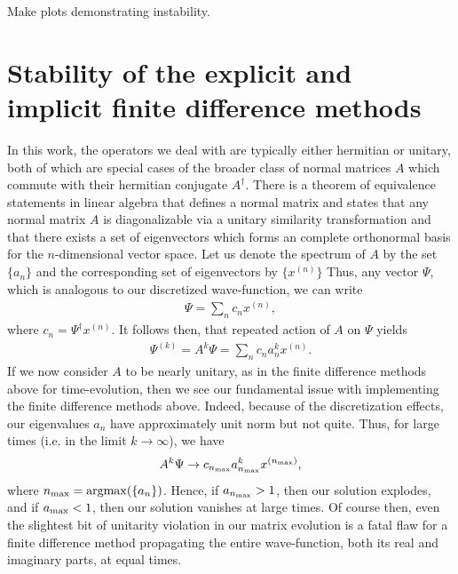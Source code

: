 {\color{red} 
    Make plots demonstrating instability.
}


\section{Stability of the explicit and implicit finite difference methods}
\label{app:stability-of-the-explicity-and-implicit-finite-difference-methods}

In this work, the operators we deal with are typically either hermitian or unitary, both of which are special cases of the broader class of normal matrices $A$ which commute with their hermitian conjugate $A^{\dagger}$.
There is a theorem of equivalence statements in linear algebra that defines a normal matrix and states that any normal matrix $A$ is diagonalizable via a unitary similarity transformation and that there exists a set of eigenvectors which forms an complete orthonormal basis for the $n$-dimensional vector space.
Let us denote the spectrum of $A$ by the set $\{ a_{n} \}$ and the corresponding set of eigenvectors by $\{ x^{(n)} \}$
Thus, any vector $\Psi$, which is analogous to our discretized wave-function, we can write
\begin{align}
    \Psi = \sum_{n} c_{n} x^{(n)}
,\end{align}
where $c_{n} = \Psi^{\dagger} x^{(n)}$.
It follows then, that repeated action of $A$ on $\Psi$ yields
\begin{align}
    \Psi^{(k)} = A^{k} \Psi = \sum_{n} c_{n} a_{n}^{k} x^{(n)}
.\end{align}
If we now consider $A$ to be nearly unitary, as in the finite difference methods above for time-evolution, then we see our fundamental issue with implementing the finite difference methods above.
Indeed, because of the discretization effects, our eigenvalues $a_{n}$ have approximately unit norm but not quite.
Thus, for large times (i.e. in the limit $k \rightarrow \infty$), we have
\begin{align}
    A^{k} \Psi \rightarrow c_{n_{\rm max}} a_{n_{\rm max}}^{k} x^{(n_{\rm max})}
,\end{align}
where $n_{\rm max} = {\rm argmax}(\{ a_{n} \})$.
Hence, if $a_{n_{\rm max}} > 1$, then our solution explodes, and if $a_{\rm max} < 1$, then our solution vanishes at large times.
Of course then, even the slightest bit of unitarity violation in our matrix evolution is a fatal flaw for a finite difference method propagating the entire wave-function, both its real and imaginary parts, at equal times.

    

